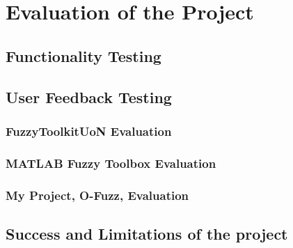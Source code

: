 \section{Evaluation of the Project}

\subsection{Functionality Testing}
\subsection{User Feedback Testing}
	\subsubsection{FuzzyToolkitUoN Evaluation}
	\subsubsection{MATLAB Fuzzy Toolbox Evaluation} 	
	\subsubsection{My Project, O-Fuzz, Evaluation}	
\subsection{Success and Limitations of the project}


